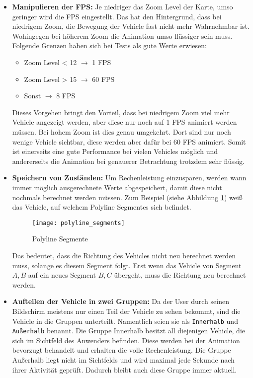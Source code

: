     \begin{itemize}
      \item \textbf{Manipulieren der FPS:} Je niedriger das Zoom Level der Karte, umso geringer wird die FPS eingestellt. Das hat den Hintergrund, dass bei niedrigem Zoom, die Bewegung der Vehicle fast nicht mehr Wahrnehmbar ist. Wohingegen bei höherem Zoom die Animation umso flüssiger sein muss. Folgende Grenzen haben sich bei Tests als gute Werte erwiesen:
      \begin{itemize}
        \item Zoom Level < 12 $\rightarrow$ 1 FPS
        \item Zoom Level > 15 $\rightarrow$ 60 FPS
        \item Sonst $\rightarrow$ 8 FPS
      \end{itemize}
      Dieses Vorgehen bringt den Vorteil, dass bei niedrigem Zoom viel mehr Vehicle angezeigt werden, aber diese nur noch auf 1 FPS animiert werden müssen. Bei hohem Zoom ist dies genau umgekehrt. Dort sind nur noch wenige Vehicle sichtbar, diese werden aber dafür bei 60 FPS animiert. Somit ist einerseits eine gute Performance bei vielen Vehicles möglich und andererseits die Animation bei genauerer Betrachtung trotzdem sehr flüssig.

      \item \textbf{Speichern von Zuständen:} Um Rechenleistung einzusparen, werden wann immer möglich ausgerechnete Werte abgespeichert, damit diese nicht nochmals berechnet werden müssen. Zum Beispiel (siehe Abbildung \ref{fig:polyline_segments}) weiß das Vehicle, auf welchem Polyline Segment\footnotemark es sich befindet. 


      \begin{figure}[htbp]
        \begin{center}
          \texttt{[image: polyline\_segments]}
          \caption{Polyline Segmente}
          \label{fig:polyline_segments}
        \end{center}
      \end{figure}

      Das bedeutet, dass die Richtung des Vehicles nicht neu berechnet werden muss, solange es diesem Segment folgt. Erst wenn das Vehicle von Segment $A,B$ auf ein neues Segment $B,C$ übergeht, muss die Richtung neu berechnet werden.

      \item \textbf{Aufteilen der Vehicle in zwei Gruppen:} Da der User durch seinen Bildschirm meistens nur einen Teil der Vehicle zu sehen bekommt, sind die Vehicle in die Gruppen unterteilt. Namentlich seien sie als \texttt{Innerhalb} und \texttt{Außerhalb} benannt. Die Gruppe Innerhalb besitzt all diejenigen Vehicle, die sich im Sichtfeld des Anwenders befinden. Diese werden bei der Animation bevorzugt behandelt und erhalten die volle Rechenleistung. Die Gruppe Außerhalb liegt nicht im Sichtfelds und wird maximal jede Sekunde nach ihrer Aktivität geprüft. Dadurch bleibt auch diese Gruppe immer aktuell.      
    \end{itemize}

  
